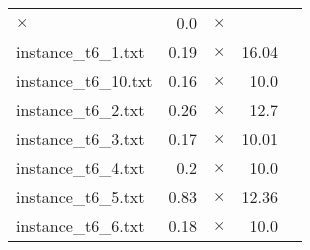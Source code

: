 \documentclass{article}
\begin{document}
\begin{center}
\begin{tabular}{lrrrr}
$\times$
 & 0.0 & 
$\times$
\\
instance\_t6\_1.txt & 0.19 & 
$\times$
 & 16.04 & 
\\
instance\_t6\_10.txt & 0.16 & 
$\times$
 & 10.0 & 
\\
instance\_t6\_2.txt & 0.26 & 
$\times$
 & 12.7 & 
\\
instance\_t6\_3.txt & 0.17 & 
$\times$
 & 10.01 & 
\\
instance\_t6\_4.txt & 0.2 & 
$\times$
 & 10.0 & 
\\
instance\_t6\_5.txt & 0.83 & 
$\times$
 & 12.36 & 
\\
instance\_t6\_6.txt & 0.18 & 
$\times$
 & 10.0 & 
\\
\hline\end{tabular}
\end{center}
\end{document}
